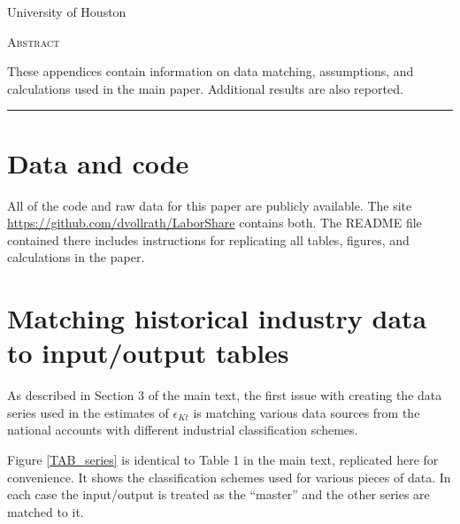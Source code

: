 \documentclass[11pt]{article}
\begin{document}
\begin{titlepage}
\vspace{2in} \noindent {\large \today}

\vspace{.5in} 

\vspace{.25in} 

\vspace{.05in} \noindent University of Houston

\vfill \noindent \textsc{Abstract} \hrulefill

\vspace{.05in} \noindent These appendices contain information on data matching, assumptions, and calculations used in the main paper. Additional results are also reported.
 
\vspace{.1in} \hrule

\vspace{.1in} 
\end{titlepage}

\pagebreak 

\section{Data and code}
\onehalfspacing All of the code and raw data for this paper are publicly available. The site \url{https://github.com/dvollrath/LaborShare} contains both. The README file contained there includes instructions for replicating all tables, figures, and calculations in the paper. 

\section{Matching historical industry data to input/output tables}
As described in Section 3 of the main text, the first issue with creating the data series used in the estimates of $\epsilon_{Kt}$ is matching various data sources from the national accounts with different industrial classification schemes. 

Figure \ref{TAB_series} is identical to Table 1 in the main text, replicated here for convenience. It shows the classification schemes used for various pieces of data. In each case the input/output is treated as the ``master'' and the other series are matched to it. 
\end{document}
